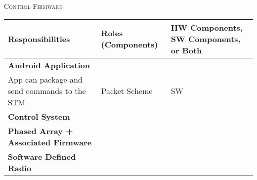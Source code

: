 \documentclass[RRC.tex]{subfiles}
\begin{document}
\bigskip

\begin{center}
	\textsc{\Large Control Firmware}
	\hrulefill
	\begin{tabular}{ | p{5cm} | p{5cm} | p{5cm} |}
		\hline
		Responsibilities & Roles (Components) & HW Components, SW Components, or Both \\ \hline
		\textbf{Android Application} & & \\ \hline
		App can package and send commands to the STM & Packet Scheme & SW  \\ \hline
		\textbf{Control System} & & \\ \hline
		\textbf{Phased Array + Associated Firmware} & & \\ \hline
		\textbf{Software Defined Radio} & & \\ \hline
		
	\end{tabular}
\end{center}
\end{document}
